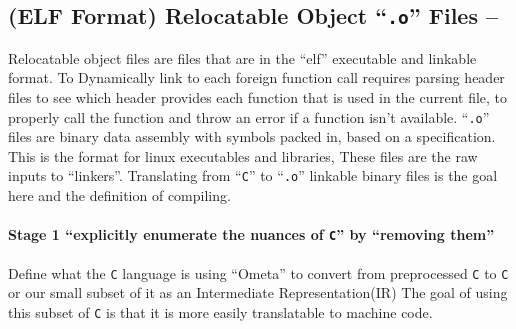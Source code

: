 \hypertarget{elf-format-relocatable-object-.o-files}{%
\subsection{\texorpdfstring{(ELF Format) Relocatable Object
``\texttt{.o}'' Files
--}{(ELF Format) Relocatable Object ``.o'' Files --}}\label{elf-format-relocatable-object-.o-files}}

Relocatable object files are files that are in the ``elf'' executable
and linkable format. To Dynamically link to each foreign function call
requires parsing header files to see which header provides each function
that is used in the current file, to properly call the function and
throw an error if a function isn't available. ``\texttt{.o}'' files are
binary data assembly with symbols packed in, based on a specification.
This is the format for linux executables and libraries, These files are
the raw inputs to ``linkers''. Translating from ``\texttt{C}'' to
``\texttt{.o}'' linkable binary files is the goal here and the
definition of compiling.

\hypertarget{stage-1-explicitly-enumerate-the-nuances-of-c-by-removing-them}{%
\paragraph{\texorpdfstring{Stage 1 ``explicitly enumerate the nuances of
\texttt{C}'' by ``removing
them''}{Stage 1 ``explicitly enumerate the nuances of C'' by ``removing them''}}\label{stage-1-explicitly-enumerate-the-nuances-of-c-by-removing-them}}

Define what the \texttt{C} language is using ``Ometa'' to convert from
preprocessed \texttt{C} to \texttt{C} or our small subset of it as an
Intermediate Representation(IR) The goal of using this subset of
\texttt{C} is that it is more easily translatable to machine code.

